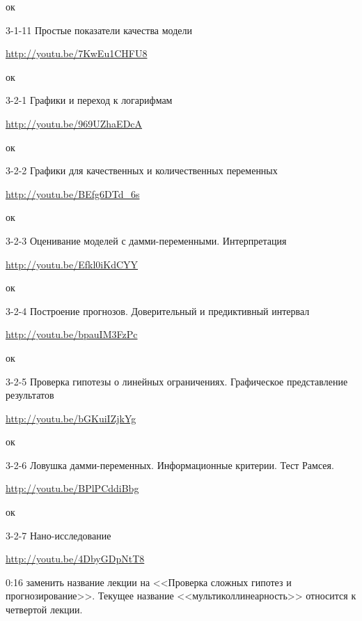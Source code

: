 \documentclass[12pt,a4paper]{article}
\begin{document}
ок

3-1-11 Простые показатели качества модели

\url{http://youtu.be/7KwEu1CHFU8}

ок

3-2-1 Графики и переход к логарифмам

\url{http://youtu.be/969UZhaEDcA}

ок

3-2-2 Графики для качественных и количественных переменных 

\url{http://youtu.be/BEfg6DTd_6s}

ок

3-2-3 Оценивание моделей с дамми-переменными. Интерпретация

\url{http://youtu.be/Efkl0iKdCYY}

ок

3-2-4 Построение прогнозов. Доверительный и предиктивный интервал

\url{http://youtu.be/bpauIM3FzPc}

ок

3-2-5 Проверка гипотезы о линейных ограничениях. Графическое представление результатов

\url{http://youtu.be/bGKuiIZjkYg}

ок

3-2-6 Ловушка дамми-переменных. Информационные критерии. Тест Рамсея.

\url{http://youtu.be/BPlPCddiBbg} 

ок

3-2-7 Нано-исследование

\url{http://youtu.be/4DbyGDpNtT8}

0:16 заменить название лекции на <<Проверка сложных гипотез и прогнозирование>>. Текущее название <<мультиколлинеарность>> относится к четвертой лекции.
\end{document}
